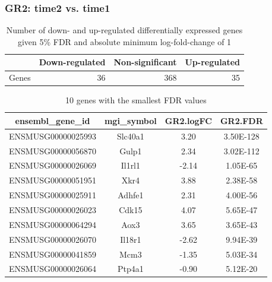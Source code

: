 \documentclass[12pt]{article}
\begin{document}
\subsubsection{GR2: time2 vs. time1}

\begin{table}[ht]
\centering
\begin{tabular}{rrrr}
  \hline
 & Down-regulated & Non-significant & Up-regulated \\ 
  \hline
Genes & 36 & 368 & 35 \\ 
   \hline
\end{tabular}
\caption{Number of down- and up-regulated differentially expressed genes given 5\% FDR and absolute minimum log-fold-change of 1 } 
\end{table}%
\begin{table}[H]
\centering
{\footnotesize
\begin{tabular}{cccc}
  \hline
ensembl\_gene\_id & mgi\_symbol & GR2.logFC & GR2.FDR \\ 
  \hline
ENSMUSG00000025993 & Slc40a1 & 3.20 & 3.50E-128 \\ 
  ENSMUSG00000056870 & Gulp1 & 2.34 & 3.02E-112 \\ 
  ENSMUSG00000026069 & Il1rl1 & -2.14 & 1.05E-65 \\ 
  ENSMUSG00000051951 & Xkr4 & 3.88 & 2.38E-58 \\ 
  ENSMUSG00000025911 & Adhfe1 & 2.31 & 4.00E-56 \\ 
  ENSMUSG00000026023 & Cdk15 & 4.07 & 5.65E-47 \\ 
  ENSMUSG00000064294 & Aox3 & 3.65 & 3.65E-43 \\ 
  ENSMUSG00000026070 & Il18r1 & -2.62 & 9.94E-39 \\ 
  ENSMUSG00000041859 & Mcm3 & -1.35 & 5.03E-34 \\ 
  ENSMUSG00000026064 & Ptp4a1 & -0.90 & 5.12E-20 \\ 
   \hline
\end{tabular}
}
\caption{10 genes with the smallest FDR values} 
\end{table}
\end{document}
